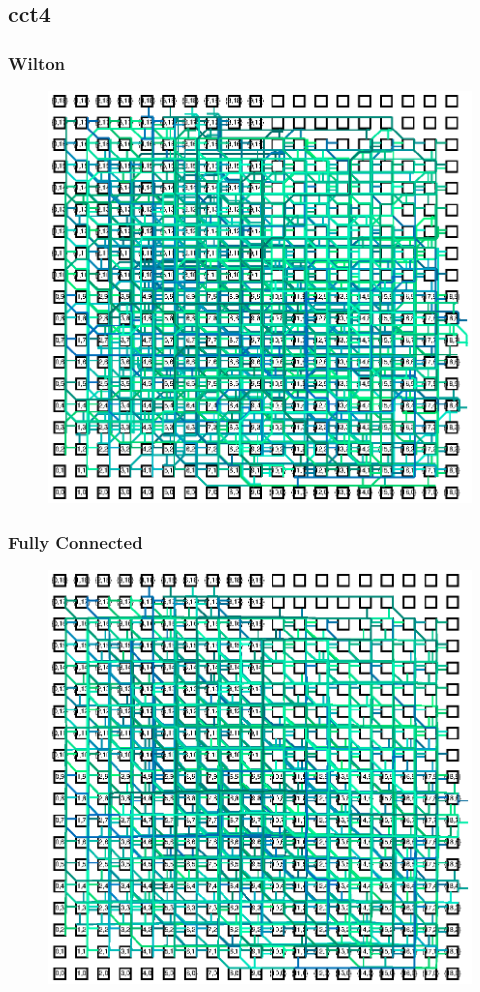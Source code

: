 \documentclass[11pt]{article}
\begin{document}
\subsection{cct4}\subsubsection{Wilton}
\begin{figure}[H]
\centering
\includegraphics[clip, viewport=154 245 464 546, width=\linewidth]{assets/wilton-cct4-as-is}
\end{figure}

\subsubsection{Fully Connected}
\begin{figure}[H]
\centering
\includegraphics[clip, viewport=153 244 464 547, width=\linewidth]{assets/fc-cct4-as-is}
\end{figure}
\end{document}
